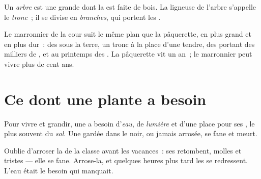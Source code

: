 \begin{definition}[Arbre]\label{def:g1:plants-around-us:tree}
Un \emph{arbre} est une grande  dont la  est
faite de bois. La  ligneuse de l'arbre s'appelle le
\emph{tronc}~; il se divise en
\emph{branches}, qui portent les .
\end{definition}

\begin{example}[Le marronnier]\label{ex:g1:plants-around-us:tree}
Le marronnier de la cour suit le même plan que la pâquerette, en
plus grand et en plus dur~: des  sous la terre, un tronc à
la place d'une  tendre, des  portant des milliers de
, et au printemps des . La pâquerette vit un an~; le
marronnier peut vivre plus de cent ans.
\end{example}

\section{Ce dont une plante a besoin}

\begin{proposition}\label{prop:g1:plants-around-us:needs}
Pour vivre et grandir, une  a besoin d'\emph{eau}, de
\emph{lumière} et d'une place pour ses , le plus souvent du
\emph{sol}. Une  gardée dans le noir, ou jamais
arrosée, se fane et meurt.
\end{proposition}
\admitted

\begin{example}\label{ex:g1:plants-around-us:wilt}
Oublie d'arroser la  de la classe avant les vacances~: ses
 retombent, molles et tristes --- elle se fane. Arrose-la,
et quelques heures plus tard les  se redressent. L'eau était
le besoin qui manquait.
\end{example}

